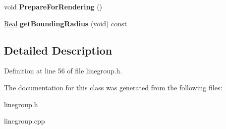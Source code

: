\begin{DoxyCompactItemize}
\item 
\hypertarget{classphys_1_1LineGroup_ab8d5c3c91dd16008429cc4cafed7f42f}{
void {\bfseries PrepareForRendering} ()}
\label{db/ddb/classphys_1_1LineGroup_ab8d5c3c91dd16008429cc4cafed7f42f}

\item 
\hypertarget{classphys_1_1LineGroup_a9dbbd74f5256ee67454ef6ede752dc32}{
\hyperlink{namespacephys_af7eb897198d265b8e868f45240230d5f}{Real} {\bfseries getBoundingRadius} (void) const }
\label{db/ddb/classphys_1_1LineGroup_a9dbbd74f5256ee67454ef6ede752dc32}

\end{DoxyCompactItemize}


\subsection{Detailed Description}


Definition at line 56 of file linegroup.h.



The documentation for this class was generated from the following files:\begin{DoxyCompactItemize}
\item 
linegroup.h\item 
linegroup.cpp\end{DoxyCompactItemize}
